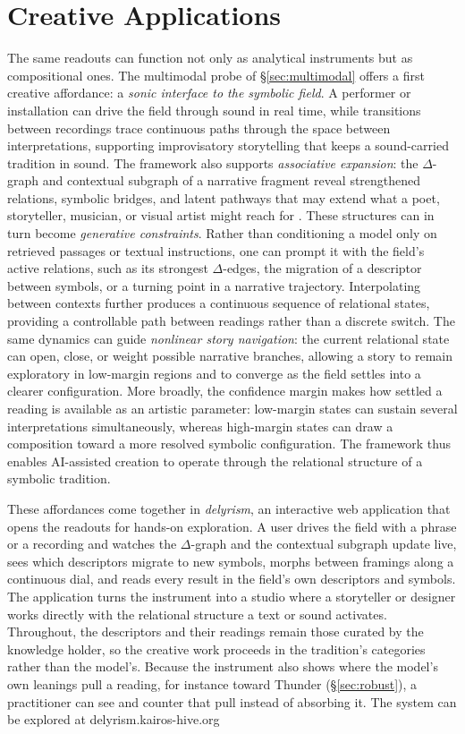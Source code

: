 \documentclass[final,creativeai]{article}
\begin{document}
\FloatBarrier
\section{Creative Applications}
The same readouts can function not only as analytical instruments but as compositional ones. The multimodal probe of \S\ref{sec:multimodal} offers a first creative affordance: a \emph{sonic interface to the symbolic field}. A performer or installation can drive the field through sound in real time, while transitions between recordings trace continuous paths through the space between interpretations, supporting improvisatory storytelling that keeps a sound-carried tradition in sound. The framework also supports \emph{associative expansion}: the $\Delta$-graph and contextual subgraph of a narrative fragment reveal strengthened relations, symbolic bridges, and latent pathways that may extend what a poet, storyteller, musician, or visual artist might reach for \citep{varshney_associative_2016, gross_lexical_2012, rick_supermind_2023}. These structures can in turn become \emph{generative constraints}. Rather than conditioning a model only on retrieved passages or textual instructions, one can prompt it with the field's active relations, such as its strongest $\Delta$-edges, the migration of a descriptor between symbols, or a turning point in a narrative trajectory. Interpolating between contexts further produces a continuous sequence of relational states, providing a controllable path between readings rather than a discrete switch. The same dynamics can guide \emph{nonlinear story navigation}: the current relational state can open, close, or weight possible narrative branches, allowing a story to remain exploratory in low-margin regions and to converge as the field settles into a clearer configuration. More broadly, the confidence margin makes how settled a reading is available as an artistic parameter: low-margin states can sustain several interpretations simultaneously, whereas high-margin states can draw a composition toward a more resolved symbolic configuration. The framework thus enables AI-assisted creation to operate through the relational structure of a symbolic tradition.

These affordances come together in \emph{delyrism}, an interactive web application that opens the readouts for hands-on exploration. A user drives the field with a phrase or a recording and watches the $\Delta$-graph and the contextual subgraph update live, sees which descriptors migrate to new symbols, morphs between framings along a continuous dial, and reads every result in the field's own descriptors and symbols. The application turns the instrument into a studio where a storyteller or designer works directly with the relational structure a text or sound activates. Throughout, the descriptors and their readings remain those curated by the knowledge holder, so the creative work proceeds in the tradition's categories rather than the model's. Because the instrument also shows where the model's own leanings pull a reading, for instance toward Thunder (\S\ref{sec:robust}), a practitioner can see and counter that pull instead of absorbing it. The system can be explored at delyrism.kairos-hive.org
\end{document}
